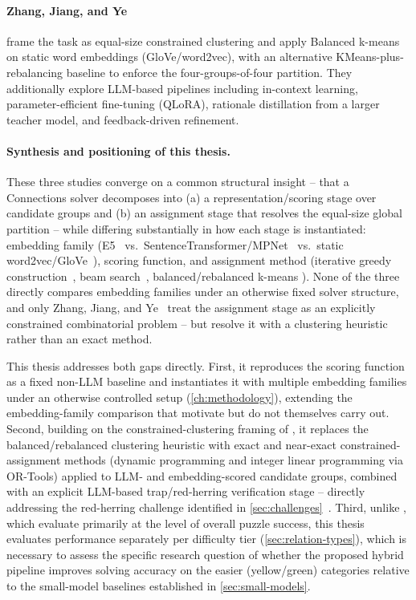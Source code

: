 \paragraph{Zhang, Jiang, and Ye~\cite{zhangetal-connections}} frame the
task as equal-size constrained clustering and apply Balanced k-means on
static word embeddings (GloVe/word2vec), with an alternative
KMeans-plus-rebalancing baseline to enforce the four-groups-of-four
partition. They additionally explore LLM-based pipelines including
in-context learning, parameter-efficient fine-tuning (QLoRA), rationale
distillation from a larger teacher model, and feedback-driven refinement.

\paragraph{Synthesis and positioning of this thesis.}
These three studies converge on a common structural insight -- that a
Connections solver decomposes into (a) a representation/scoring stage
over candidate groups and (b) an assignment stage that resolves the
equal-size global partition -- while differing substantially in how each
stage is instantiated: embedding family (E5~\cite{loredolopez2025} vs.\
SentenceTransformer/MPNet~\cite{toddetal2024} vs.\ static
word2vec/GloVe~\cite{zhangetal-connections}), scoring function, and
assignment method (iterative greedy construction~\cite{toddetal2024},
beam search~\cite{loredolopez2025}, balanced/rebalanced k-means
\cite{zhangetal-connections}). None of the three directly compares
embedding families under an otherwise fixed solver structure, and only
Zhang, Jiang, and Ye~\cite{zhangetal-connections} treat the assignment
stage as an explicitly constrained combinatorial problem -- but resolve
it with a clustering heuristic rather than an exact method.

This thesis addresses both gaps directly. First, it reproduces the
\cite{loredolopez2025} scoring function as a fixed non-LLM baseline and
instantiates it with multiple embedding families under an otherwise
controlled setup (\autoref{ch:methodology}), extending the
embedding-family comparison that \cite{toddetal2024, loredolopez2025,
zhangetal-connections} motivate but do not themselves carry out. Second,
building on the constrained-clustering framing of
\cite{zhangetal-connections}, it replaces the balanced/rebalanced
clustering heuristic with exact and near-exact constrained-assignment
methods (dynamic programming and integer linear programming via
OR-Tools) applied to LLM- and embedding-scored candidate groups, combined
with an explicit LLM-based trap/red-herring verification stage --
directly addressing the red-herring challenge identified in
\autoref{sec:challenges}~\cite{nyt-tips-tricks-2023}. Third, unlike
\cite{toddetal2024, loredolopez2025, zhangetal-connections}, which
evaluate primarily at the level of overall puzzle success, this thesis
evaluates performance separately per difficulty tier
(\autoref{sec:relation-types}), which is necessary to assess the
specific research question of whether the proposed hybrid pipeline
improves solving accuracy on the easier (yellow/green) categories
relative to the small-model baselines established in
\autoref{sec:small-models}.


